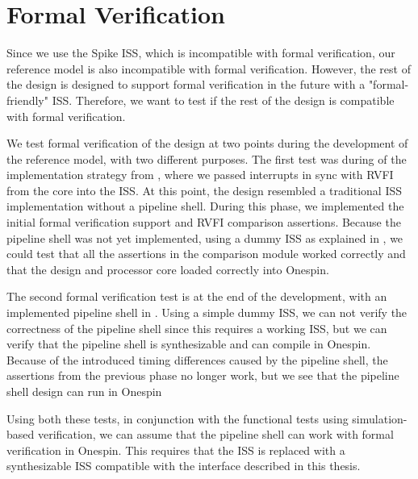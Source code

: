 


\section{Formal Verification}
\label{sec:res_formal}

Since we use the Spike ISS, which is incompatible with formal verification, our reference model is also incompatible with formal verification. However, the rest of the design is designed to support formal verification in the future with a "formal-friendly" ISS. Therefore, we want to test if the rest of the design is compatible with formal verification.

We test formal verification of the design at two points during the development of the reference model, with two different purposes.
The first test was during  of the implementation strategy from , where we passed interrupts in sync with RVFI from the core into the ISS. At this point, the design resembled a traditional ISS implementation without a pipeline shell. During this phase, we implemented the initial formal verification support and RVFI comparison assertions. Because the pipeline shell was not yet implemented, using a dummy ISS as explained in , we could test that all the assertions in the comparison module worked correctly and that the design and processor core loaded correctly into Onespin. 

The second formal verification test is at the end of the development, with an implemented pipeline shell in . Using a simple dummy ISS, we can not verify the correctness of the pipeline shell since this requires a working ISS, but we can verify that the pipeline shell is synthesizable and can compile in Onespin. Because of the introduced timing differences caused by the pipeline shell, the assertions from the previous phase no longer work, but we see that the pipeline shell design can run in Onespin

Using both these tests, in conjunction with the functional tests using simulation-based verification, we can assume that the pipeline shell can work with formal verification in Onespin. This requires that the ISS is replaced with a synthesizable ISS compatible with the interface described in this thesis.